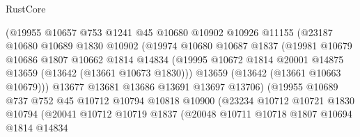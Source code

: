 \begin{lexlean}{RustCore}
\begin{coremodule}
                          (@19955
                            @10657
                            @753
                            @1241
                            @45
                            @10680
                            @10902
                            @10926
                            @11155
                            (@23187
                              @10680
                              @10689
                              @1830
                              @10902
                              (@19974
                                @10680
                                @10687
                                @1837
                                (@19981
                                  @10679
                                  @10686
                                  @1807
                                  @10662
                                  @1814
                                  @14834
                                  (@19995
                                    @10672
                                    @1814
                                    @20001
                                    @14875
                                    @13659
                                    (@13642 (@13661 @10673 @1830)))
                                  @13659
                                  (@13642 (@13661 @10663 @10679)))
                                @13677
                                @13681
                                @13686
                                @13691
                                @13697
                                @13706)
                              (@19955
                                @10689
                                @737
                                @752
                                @45
                                @10712
                                @10794
                                @10818
                                @10900
                                (@23234
                                  @10712
                                  @10721
                                  @1830
                                  @10794
                                  (@20041
                                    @10712
                                    @10719
                                    @1837
                                    (@20048
                                      @10711
                                      @10718
                                      @1807
                                      @10694
                                      @1814
                                      @14834

\end{coremodule}
\end{lexlean}
